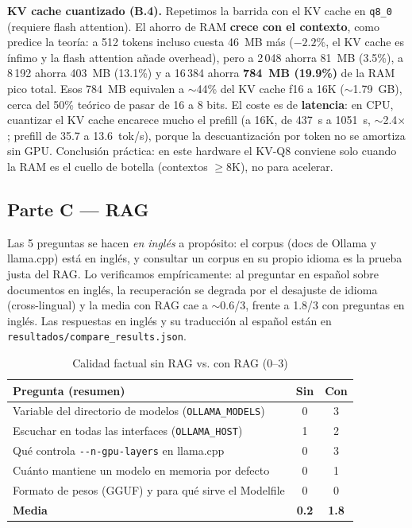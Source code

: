 \documentclass[conference]{IEEEtran}
\begin{document}
\textbf{KV cache cuantizado (B.4).} Repetimos la barrida con el KV cache en
\texttt{q8\_0} (requiere flash attention). El ahorro de RAM \textbf{crece con el
contexto}, como predice la teoría: a 512 tokens incluso cuesta 46~MB más
($-2.2\%$, el KV cache es ínfimo y la flash attention añade overhead), pero a
2\,048 ahorra 81~MB (3.5\%), a 8\,192 ahorra 403~MB (13.1\%) y a 16\,384 ahorra
\textbf{784~MB (19.9\%)} de la RAM pico total. Esos 784~MB equivalen a $\sim$44\%
del KV cache f16 a 16K ($\sim$1.79~GB), cerca del 50\% teórico de pasar de 16 a
8 bits. El coste es de \textbf{latencia}: en CPU, cuantizar el KV cache encarece
mucho el prefill (a 16K, de 437~s a 1051~s, $\sim$2.4$\times$; prefill de 35.7 a
13.6~tok/s), porque la descuantización por token no se amortiza sin GPU.
Conclusión práctica: en este hardware el KV-Q8 conviene solo cuando la RAM es el
cuello de botella (contextos $\geq$8K), no para acelerar.

\subsection{Parte C --- RAG}

Las 5 preguntas se hacen \emph{en inglés} a propósito: el corpus (docs de
Ollama y llama.cpp) está en inglés, y consultar un corpus en su propio idioma es
la prueba justa del RAG. Lo verificamos empíricamente: al preguntar en español
sobre documentos en inglés, la recuperación se degrada por el desajuste de
idioma (cross-lingual) y la media con RAG cae a $\sim$0.6/3, frente a 1.8/3 con
preguntas en inglés. Las respuestas en inglés y su traducción al español están
en \texttt{resultados/compare\_results.json}.

\begin{table}[t]
\caption{Calidad factual sin RAG vs. con RAG (0--3)}
\label{tab:rag}
\centering
\begin{tabular}{p{}cc}
\toprule
\textbf{Pregunta (resumen)} & \textbf{Sin} & \textbf{Con} \\
\midrule
Variable del directorio de modelos (\texttt{OLLAMA\_MODELS}) & 0 & 3 \\
Escuchar en todas las interfaces (\texttt{OLLAMA\_HOST}) & 1 & 2 \\
Qué controla \texttt{-{}-n-gpu-layers} en llama.cpp & 0 & 3 \\
Cuánto mantiene un modelo en memoria por defecto & 0 & 1 \\
Formato de pesos (GGUF) y para qué sirve el Modelfile & 0 & 0 \\
\midrule
\textbf{Media} & \textbf{0.2} & \textbf{1.8} \\
\bottomrule
\end{tabular}
\end{table}
\end{document}
